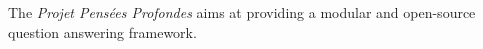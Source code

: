 The \emph{Projet Pensées Profondes} aims at providing a modular and open-source question answering framework.

